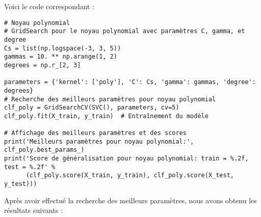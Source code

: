 \documentclass{article}
\begin{document}
Voici le code correspondant :

\begin{verbatim}
# Noyau polynomial
# GridSearch pour le noyau polynomial avec paramètres C, gamma, et degree
Cs = list(np.logspace(-3, 3, 5))
gammas = 10. ** np.arange(1, 2)
degrees = np.r_[2, 3]

parameters = {'kernel': ['poly'], 'C': Cs, 'gamma': gammas, 'degree': degrees}
# Recherche des meilleurs paramètres pour noyau polynomial
clf_poly = GridSearchCV(SVC(), parameters, cv=5)  
clf_poly.fit(X_train, y_train)  # Entraînement du modèle

# Affichage des meilleurs paramètres et des scores
print('Meilleurs paramètres pour noyau polynomial:', clf_poly.best_params_)
print('Score de généralisation pour noyau polynomial: train = %.2f, test = %.2f' %
      (clf_poly.score(X_train, y_train), clf_poly.score(X_test, y_test)))
\end{verbatim}


Après avoir effectué la recherche des meilleurs paramètres, nous avons
obtenu les résultats suivants :
\end{document}
